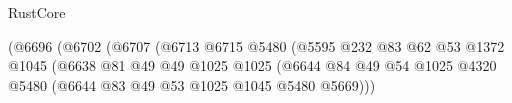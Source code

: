 \begin{lexlean}{RustCore}
\begin{coremodule}
                                                              (@6696
                                                                (@6702
                                                                  (@6707
                                                                    (@6713
                                                                      @6715
                                                                      @5480
                                                                      (@5595
                                                                        @232
                                                                        @83
                                                                        @62
                                                                        @53
                                                                        @1372
                                                                        @1045
                                                                        (@6638
                                                                          @81
                                                                          @49
                                                                          @49
                                                                          @1025
                                                                          @1025
                                                                          (@6644
                                                                            @84
                                                                            @49
                                                                            @54
                                                                            @1025
                                                                            @4320
                                                                            @5480
                                                                            (@6644
                                                                              @83
                                                                              @49
                                                                              @53
                                                                              @1025
                                                                              @1045
                                                                              @5480
                                                                              @5669)))

\end{coremodule}
\end{lexlean}
